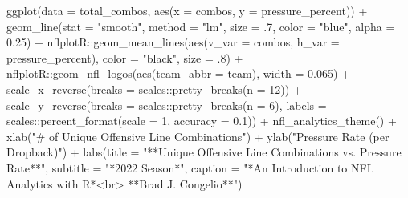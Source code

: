 \documentclass[
  letterpaper,
]{krantz}
\newenvironment{Shaded}{\begin{snugshade}}{\end{snugshade}}
\newcommand{\AttributeTok}[1]{\textcolor[rgb]{0.40,0.45,0.13}{#1}}
\newcommand{\DecValTok}[1]{\textcolor[rgb]{0.68,0.00,0.00}{#1}}
\newcommand{\FloatTok}[1]{\textcolor[rgb]{0.68,0.00,0.00}{#1}}
\newcommand{\FunctionTok}[1]{\textcolor[rgb]{0.28,0.35,0.67}{#1}}
\newcommand{\NormalTok}[1]{\textcolor[rgb]{0.00,0.23,0.31}{#1}}
\newcommand{\SpecialCharTok}[1]{\textcolor[rgb]{0.37,0.37,0.37}{#1}}
\newcommand{\StringTok}[1]{\textcolor[rgb]{0.13,0.47,0.30}{#1}}
\begin{document}
\begin{Shaded}
\begin{Highlighting}[]
\FunctionTok{ggplot}\NormalTok{(}\AttributeTok{data =}\NormalTok{ total\_combos, }\FunctionTok{aes}\NormalTok{(}\AttributeTok{x =}\NormalTok{ combos, }\AttributeTok{y =}\NormalTok{ pressure\_percent)) }\SpecialCharTok{+}
  \FunctionTok{geom\_line}\NormalTok{(}\AttributeTok{stat =} \StringTok{"smooth"}\NormalTok{, }\AttributeTok{method =} \StringTok{"lm"}\NormalTok{,}
            \AttributeTok{size =}\NormalTok{ .}\DecValTok{7}\NormalTok{, }\AttributeTok{color =} \StringTok{"blue"}\NormalTok{,}
            \AttributeTok{alpha =} \FloatTok{0.25}\NormalTok{) }\SpecialCharTok{+}
\NormalTok{  nflplotR}\SpecialCharTok{::}\FunctionTok{geom\_mean\_lines}\NormalTok{(}\FunctionTok{aes}\NormalTok{(}\AttributeTok{v\_var =}\NormalTok{ combos, }\AttributeTok{h\_var =}\NormalTok{ pressure\_percent),}
                            \AttributeTok{color =} \StringTok{"black"}\NormalTok{, }\AttributeTok{size =}\NormalTok{ .}\DecValTok{8}\NormalTok{) }\SpecialCharTok{+}
\NormalTok{  nflplotR}\SpecialCharTok{::}\FunctionTok{geom\_nfl\_logos}\NormalTok{(}\FunctionTok{aes}\NormalTok{(}\AttributeTok{team\_abbr =}\NormalTok{ team), }\AttributeTok{width =} \FloatTok{0.065}\NormalTok{) }\SpecialCharTok{+}
  \FunctionTok{scale\_x\_reverse}\NormalTok{(}\AttributeTok{breaks =}\NormalTok{ scales}\SpecialCharTok{::}\FunctionTok{pretty\_breaks}\NormalTok{(}\AttributeTok{n =} \DecValTok{12}\NormalTok{)) }\SpecialCharTok{+}
  \FunctionTok{scale\_y\_reverse}\NormalTok{(}\AttributeTok{breaks =}\NormalTok{ scales}\SpecialCharTok{::}\FunctionTok{pretty\_breaks}\NormalTok{(}\AttributeTok{n =} \DecValTok{6}\NormalTok{),}
                     \AttributeTok{labels =}\NormalTok{ scales}\SpecialCharTok{::}\FunctionTok{percent\_format}\NormalTok{(}\AttributeTok{scale =} \DecValTok{1}\NormalTok{,}
                                                     \AttributeTok{accuracy =} \FloatTok{0.1}\NormalTok{)) }\SpecialCharTok{+}
  \FunctionTok{nfl\_analytics\_theme}\NormalTok{() }\SpecialCharTok{+}
  \FunctionTok{xlab}\NormalTok{(}\StringTok{"\# of Unique Offensive Line Combinations"}\NormalTok{) }\SpecialCharTok{+}
  \FunctionTok{ylab}\NormalTok{(}\StringTok{"Pressure Rate (per Dropback)"}\NormalTok{) }\SpecialCharTok{+}
  \FunctionTok{labs}\NormalTok{(}\AttributeTok{title =} \StringTok{"**Unique Offensive Line Combinations vs. Pressure Rate**"}\NormalTok{,}
       \AttributeTok{subtitle =} \StringTok{"*2022 Season*"}\NormalTok{,}
       \AttributeTok{caption =} \StringTok{"*An Introduction to NFL Analytics with R*\textless{}br\textgreater{}}
\StringTok{       **Brad J. Congelio**"}\NormalTok{)}
\end{Highlighting}
\end{Shaded}
\end{document}
